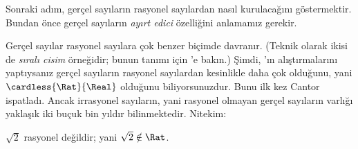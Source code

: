


Sonraki adım, gerçel sayıların rasyonel sayılardan nasıl kurulacağını göstermektir.
Bundan önce gerçel sayıların \emph{ayırt edici} özelliğini anlamamız gerekir.

Gerçel sayılar rasyonel sayılara çok benzer biçimde davranır. (Teknik olarak
ikisi de \emph{sıralı cisim} örneğidir; bunun tanımı için
'e bakın.) Şimdi, 'ın
alıştırmalarını yaptıysanız gerçel sayıların rasyonel sayılardan kesinlikle daha
çok olduğunu, yani $\cardless{\Rat}{\Real}$ olduğunu biliyorsunuzdur. Bunu ilk
kez Cantor ispatladı. Ancak irrasyonel sayıların, yani rasyonel olmayan gerçel
sayıların varlığı yaklaşık iki buçuk bin yıldır bilinmektedir. Nitekim:
\begin{thm}
$\sqrt{2}$ rasyonel değildir; yani $\sqrt{2} \notin \Rat$.
\end{thm}

